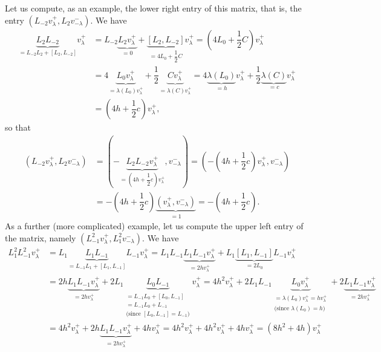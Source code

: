 \documentclass
[numbers=enddot,12pt,final,onecolumn,german,notitlepage]{scrartcl}%
\theoremstyle{definition}
\begin{document}
Let us compute, as an example, the lower right entry of this matrix, that is,
the entry $\left(  L_{-2}v_{\lambda}^{+},L_{2}v_{-\lambda}^{-}\right)  $. We
have%
\begin{align*}
\underbrace{L_{2}L_{-2}}_{=L_{-2}L_{2}+\left[  L_{2},L_{-2}\right]
}v_{\lambda}^{+}  &  =L_{-2}\underbrace{L_{2}v_{\lambda}^{+}}_{=0}%
+\underbrace{\left[  L_{2},L_{-2}\right]  }_{=4L_{0}+\dfrac{1}{2}C}v_{\lambda
}^{+}=\left(  4L_{0}+\dfrac{1}{2}C\right)  v_{\lambda}^{+}\\
&  =4\underbrace{L_{0}v_{\lambda}^{+}}_{=\lambda\left(  L_{0}\right)
v_{\lambda}^{+}}+\dfrac{1}{2}\underbrace{Cv_{\lambda}^{+}}_{=\lambda\left(
C\right)  v_{\lambda}^{+}}=4\underbrace{\lambda\left(  L_{0}\right)  }%
_{=h}v_{\lambda}^{+}+\dfrac{1}{2}\underbrace{\lambda\left(  C\right)  }%
_{=c}v_{\lambda}^{+}\\
&  =\left(  4h+\dfrac{1}{2}c\right)  v_{\lambda}^{+},
\end{align*}
so that%
\begin{align*}
\left(  L_{-2}v_{\lambda}^{+},L_{2}v_{-\lambda}^{-}\right)   &  =\left(
-\underbrace{L_{2}L_{-2}v_{\lambda}^{+}}_{=\left(  4h+\dfrac{1}{2}c\right)
v_{\lambda}^{+}},v_{-\lambda}^{-}\right)  =\left(  -\left(  4h+\dfrac{1}%
{2}c\right)  v_{\lambda}^{+},v_{-\lambda}^{-}\right) \\
&  =-\left(  4h+\dfrac{1}{2}c\right)  \underbrace{\left(  v_{\lambda}%
^{+},v_{-\lambda}^{-}\right)  }_{=1}=-\left(  4h+\dfrac{1}{2}c\right)  .
\end{align*}
As a further (more complicated) example, let us compute the upper left entry
of the matrix, namely $\left(  L_{-1}^{2}v_{\lambda}^{+},L_{1}^{2}v_{-\lambda
}^{-}\right)  $. We have%
\begin{align*}
L_{1}^{2}L_{-1}^{2}v_{\lambda}^{+}  &  =L_{1}\underbrace{L_{1}L_{-1}}%
_{=L_{-1}L_{1}+\left[  L_{1},L_{-1}\right]  }L_{-1}v_{\lambda}^{+}=L_{1}%
L_{-1}\underbrace{L_{1}L_{-1}v_{\lambda}^{+}}_{=2hv_{\lambda}^{+}}%
+L_{1}\underbrace{\left[  L_{1},L_{-1}\right]  }_{=2L_{0}}L_{-1}v_{\lambda
}^{+}\\
&  =2h\underbrace{L_{1}L_{-1}v_{\lambda}^{+}}_{=2hv_{\lambda}^{+}}%
+2L_{1}\underbrace{L_{0}L_{-1}}_{\substack{=L_{-1}L_{0}+\left[  L_{0}%
,L_{-1}\right]  \\=L_{-1}L_{0}+L_{-1}\\\text{(since }\left[  L_{0}%
,L_{-1}\right]  =L_{-1}\text{)}}}v_{\lambda}^{+}=4h^{2}v_{\lambda}^{+}%
+2L_{1}L_{-1}\underbrace{L_{0}v_{\lambda}^{+}}_{\substack{=\lambda\left(
L_{0}\right)  v_{\lambda}^{+}=hv_{\lambda}^{+}\\\text{(since }\lambda\left(
L_{0}\right)  =h\text{)}}}+2\underbrace{L_{1}L_{-1}v_{\lambda}^{+}%
}_{=2hv_{\lambda}^{+}}\\
&  =4h^{2}v_{\lambda}^{+}+2h\underbrace{L_{1}L_{-1}v_{\lambda}^{+}%
}_{=2hv_{\lambda}^{+}}+4hv_{\lambda}^{+}=4h^{2}v_{\lambda}^{+}+4h^{2}%
v_{\lambda}^{+}+4hv_{\lambda}^{+}=\left(  8h^{2}+4h\right)  v_{\lambda}^{+}%
\end{align*}
\end{document}
